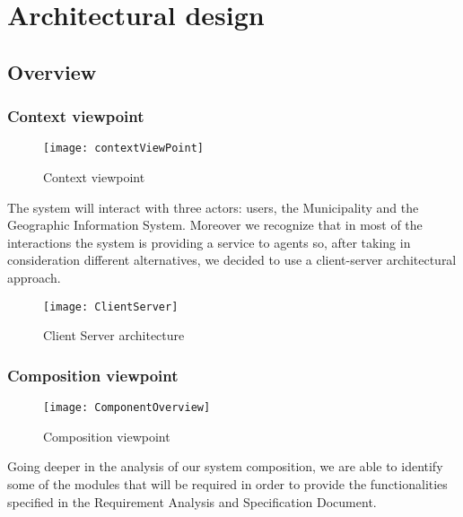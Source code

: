 \section{Architectural design}

\subsection{Overview}
	\subsubsection{Context viewpoint}
	
		\begin{figure}[h]
			\centering
			\texttt{[image: contextViewPoint]}
			\caption{
				\label{fig:contextViewPoint} 
				Context viewpoint
			}
		\end{figure}

		The system will interact with three actors: users, the Municipality and the Geographic Information System.
		Moreover we recognize that in most of the interactions the system is providing a service to agents so, after taking in consideration different alternatives, we decided to use a client-server architectural approach.

		\begin{figure}[h]
			\centering
			\texttt{[image: ClientServer]}
			\caption{
				\label{fig:ClientServer} 
				Client Server architecture
			}
		\end{figure} 
		
	\subsubsection{Composition viewpoint}
	
		\begin{figure}[h]
			\centering
			\texttt{[image: ComponentOverview]}
			\caption{
				\label{fig:compositionViewPoint} 
				Composition viewpoint
			}
		\end{figure}
		  
		Going deeper in the analysis of our system composition, we are able to identify some of the modules that will be required in order to provide the functionalities specified in the Requirement Analysis and Specification Document. 

